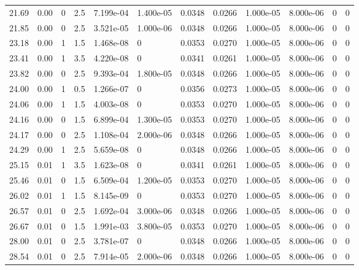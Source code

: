 \documentclass[preview]{standalone}
\begin{document}
{{{\begin{tabular}{L{1.2cm}C{1.2cm} C{0.3cm}C{0.5cm} C{1.4cm}C{1.4cm} C{1.4cm}C{1.4cm} C{1.6cm}C{1.6cm} C{1.6cm}C{1.6cm}}
  21.69  &  0.00  & 0     & 2.5 &  7.199e-04  & 1.400e-05  &  0.0348&   0.0266& 1.000e-05 & 8.000e-06   &  0 & 0  \\ 
  21.85  &  0.00  & 0     & 2.5 &  3.521e-05  & 1.000e-06  &  0.0348&   0.0266& 1.000e-05 & 8.000e-06   &  0 & 0  \\ 
  23.18  &  0.00  & 1     & 1.5 &  1.468e-08  & 0  &  0.0353&   0.0270& 1.000e-05 & 8.000e-06   &  0 & 0  \\ 
  23.41  &  0.00  & 1     & 3.5 &  4.220e-08  & 0  &  0.0341&   0.0261& 1.000e-05 & 8.000e-06   &  0 & 0  \\ 
  23.82  &  0.00  & 0     & 2.5 &  9.393e-04  & 1.800e-05  &  0.0348&   0.0266& 1.000e-05 & 8.000e-06   &  0 & 0  \\ 
  24.00  &  0.00  & 1     & 0.5 &  1.266e-07  & 0  &  0.0356&   0.0273& 1.000e-05 & 8.000e-06   &  0 & 0  \\ 
  24.06  &  0.00  & 1     & 1.5 &  4.003e-08  & 0  &  0.0353&   0.0270& 1.000e-05 & 8.000e-06   &  0 & 0  \\ 
  24.16  &  0.00  & 0     & 1.5 &  6.899e-04  & 1.300e-05  &  0.0353&   0.0270& 1.000e-05 & 8.000e-06   &  0 & 0  \\ 
  24.17  &  0.00  & 0     & 2.5 &  1.108e-04  & 2.000e-06  &  0.0348&   0.0266& 1.000e-05 & 8.000e-06   &  0 & 0  \\ 
  24.29  &  0.00  & 1     & 2.5 &  5.659e-08  & 0  &  0.0348&   0.0266& 1.000e-05 & 8.000e-06   &  0 & 0  \\ 
  25.15  &  0.01  & 1     & 3.5 &  1.623e-08  & 0  &  0.0341&   0.0261& 1.000e-05 & 8.000e-06   &  0 & 0  \\ 
  25.46  &  0.01  & 0     & 1.5 &  6.509e-04  & 1.200e-05  &  0.0353&   0.0270& 1.000e-05 & 8.000e-06   &  0 & 0  \\ 
  26.02  &  0.01  & 1     & 1.5 &  8.145e-09  & 0  &  0.0353&   0.0270& 1.000e-05 & 8.000e-06   &  0 & 0  \\ 
  26.57  &  0.01  & 0     & 2.5 &  1.692e-04  & 3.000e-06  &  0.0348&   0.0266& 1.000e-05 & 8.000e-06   &  0 & 0  \\ 
  26.67  &  0.01  & 0     & 1.5 &  1.991e-03  & 3.800e-05  &  0.0353&   0.0270& 1.000e-05 & 8.000e-06   &  0 & 0  \\ 
  28.00  &  0.01  & 0     & 2.5 &  3.781e-07  & 0  &  0.0348&   0.0266& 1.000e-05 & 8.000e-06   &  0 & 0  \\ 
  28.54  &  0.01  & 0     & 2.5 &  7.914e-05  & 2.000e-06  &  0.0348&   0.0266& 1.000e-05 & 8.000e-06   &  0 & 0  \\ 

\end{tabular}}}}
\end{document}
